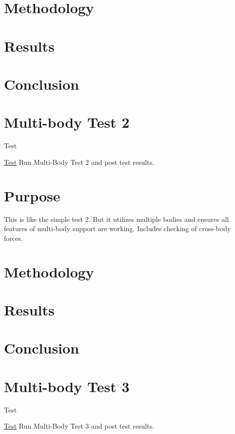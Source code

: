 \section*{Methodology}

\section*{Results}

\section*{Conclusion}\hypertarget{MultiBodyTest2}{}\section{Multi-\/body Test 2}\label{MultiBodyTest2}
\begin{DoxyRefDesc}{Test}
\item[\hyperlink{test__test000002}{Test}]Run Multi-\/\-Body Test 2 and post test results.\end{DoxyRefDesc}


\section*{Purpose}

This is like the simple test 2. But it utilizes multiple bodies and ensures all features of multi-\/body support are working. Includes checking of cross-\/body forces.

\section*{Methodology}

\section*{Results}

\section*{Conclusion}\hypertarget{MultiBodyTest3}{}\section{Multi-\/body Test 3}\label{MultiBodyTest3}
\begin{DoxyRefDesc}{Test}
\item[\hyperlink{test__test000003}{Test}]Run Multi-\/\-Body Test 3 and post test results.\end{DoxyRefDesc}


